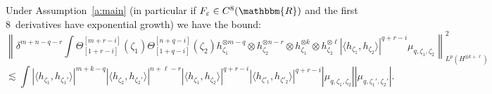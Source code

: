 \begin{lemma}
  \label{l:est-binary}Under Assumption~\ref{a:main} (in particular if
  $F_{\varepsilon} \in C^8 (\mathbbm{R})$ and the first 8~derivatives have
  exponential growth) we have the bound:
  \[ \left\| \delta^{m + n - q - r} \int \Theta^{[m + r - i]}_{[1 + r - i]}
     (\zeta_1) \Theta_{[1 + q - i]}^{[n + q - i]} (\zeta_2)
     h_{\zeta_1}^{\otimes m - q} \otimes h^{\otimes n - r}_{\zeta_2} \otimes
     h^{\otimes k}_{\zeta_1} \otimes h^{\otimes \ell}_{\zeta_2} | \langle
     h_{\zeta_1}, h_{\zeta_2} \rangle |^{q + r - i} \mu_{q, \zeta_1, \zeta_2}
     \right\|^2_{L^p (H^{\otimes k + \ell})} \]
  \[ \lesssim \int | \langle h_{\zeta_1}, h_{\zeta_1'} \rangle |^{m + k - q} |
     \langle h_{\zeta_2}, h_{\zeta_2'} \rangle |^{n + \ell - r} | \langle
     h_{\zeta_1}, h_{\zeta_2} \rangle |^{q + r - i} | \langle h_{\zeta'_1},
     h_{\zeta'_2} \rangle |^{q + r - i} | \mu_{q, \zeta_1, \zeta_2} | |
     \mu_{q, \zeta_1', \zeta_2'} | . \]
\end{lemma}

